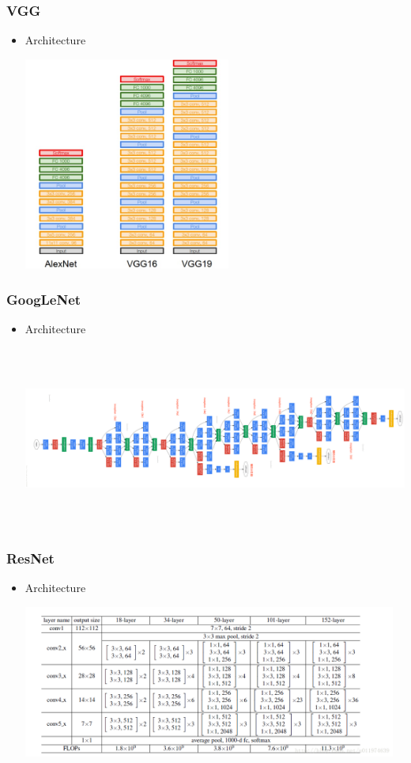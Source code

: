 \begin{frame}
\frametitle{VGG}
	\small
	\begin{itemize}
		\item Architecture
			\centerline{\includegraphics[height=7cm]{AlexNet-detail.jpg}}
	\end{itemize}
\end{frame}
\begin{frame}
\frametitle{GoogLeNet}
	\small
	\begin{itemize}
		\item Architecture
			\centerline{\includegraphics[height=6cm]{GoogLeNet.png}}
	\end{itemize}
\end{frame}
\begin{frame}
\frametitle{ResNet}
	\small
	\begin{itemize}
		\item Architecture
			\centerline{\includegraphics[height=5cm]{ResNet.png}}
	\end{itemize}
\end{frame}
\ifx\allfiles\undefined

\fi
